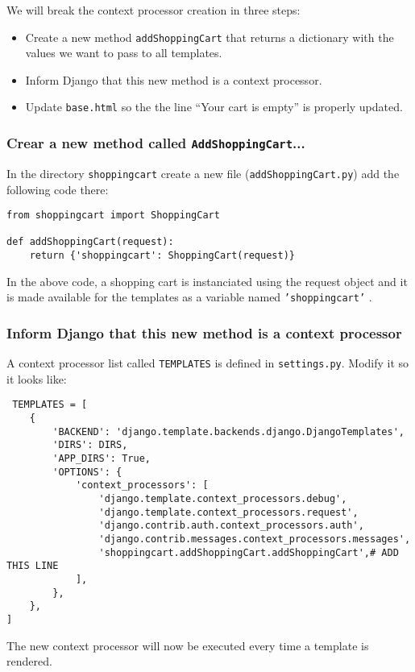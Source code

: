 \documentclass[12pt]{article} %
\newcommand{\ttt}[1]{\texttt{#1}}%
\newcommand{\hhh}[1]{\texttt{#1}}%
\newcommand{\settings}{\texttt{settings.py}}%
\begin{document}
We will break the context processor creation in three steps:

\begin{itemize}
 \item Create a new method \ttt{addShoppingCart} that returns a dictionary with the values we want to pass to all templates.
 \item Inform Django that this new method is a context processor.
 \item Update \hhh{base.html} so the the line ``Your cart is empty'' is properly updated.
\end{itemize}

\subsubsection{Crear a new method called \ttt{AddShoppingCart}...}

In the directory \ttt{shoppingcart} create a new file (\ttt{addShoppingCart.py}) add the following code there:

\begin{lstlisting}
from shoppingcart import ShoppingCart

def addShoppingCart(request):
    return {'shoppingcart': ShoppingCart(request)}

\end{lstlisting}
In the above code, a shopping cart is instanciated using the request object and it is made available for the templates as a variable named \ttt{'shoppingcart'} .


\subsubsection{Inform Django that this new method is a context processor}

A context processor list called \ttt{TEMPLATES} is defined in \settings{}. Modify it
so it looks like:

\begin{lstlisting}
 TEMPLATES = [
    {
        'BACKEND': 'django.template.backends.django.DjangoTemplates',
        'DIRS': DIRS,
        'APP_DIRS': True,
        'OPTIONS': {
            'context_processors': [
                'django.template.context_processors.debug',
                'django.template.context_processors.request',
                'django.contrib.auth.context_processors.auth',
                'django.contrib.messages.context_processors.messages',
                'shoppingcart.addShoppingCart.addShoppingCart',# ADD THIS LINE
            ],
        },
    },
]
\end{lstlisting}
The new context processor will now be executed every time a template is rendered.
\end{document}
